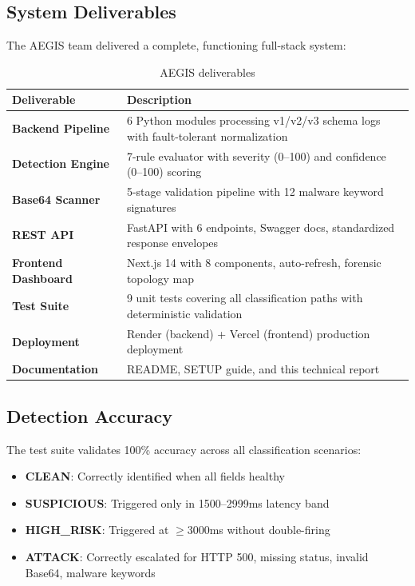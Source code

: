 \documentclass[12pt,a4paper]{article}
\begin{document}
\subsection{System Deliverables}

The AEGIS team delivered a complete, functioning full-stack system:

\begin{table}[H]
\centering
\begin{tabularx}{\linewidth}{>{\bfseries}l X}
\toprule
Deliverable & Description \\
\midrule
Backend Pipeline & 6 Python modules processing v1/v2/v3 schema logs with fault-tolerant normalization \\
Detection Engine & 7-rule evaluator with severity (0--100) and confidence (0--100) scoring \\
Base64 Scanner & 5-stage validation pipeline with 12 malware keyword signatures \\
REST API & FastAPI with 6 endpoints, Swagger docs, standardized response envelopes \\
Frontend Dashboard & Next.js 14 with 8 components, auto-refresh, forensic topology map \\
Test Suite & 9 unit tests covering all classification paths with deterministic validation \\
Deployment & Render (backend) + Vercel (frontend) production deployment \\
Documentation & README, SETUP guide, and this technical report \\
\bottomrule
\end{tabularx}
\caption{AEGIS deliverables}
\end{table}

\subsection{Detection Accuracy}

The test suite validates 100\% accuracy across all classification scenarios:

\begin{itemize}[noitemsep]
    \item \textbf{CLEAN}: Correctly identified when all fields healthy
    \item \textbf{SUSPICIOUS}: Triggered only in 1500--2999ms latency band
    \item \textbf{HIGH\_RISK}: Triggered at $\geq$3000ms without double-firing
    \item \textbf{ATTACK}: Correctly escalated for HTTP 500, missing status, invalid Base64, malware keywords
\end{itemize}
\end{document}
